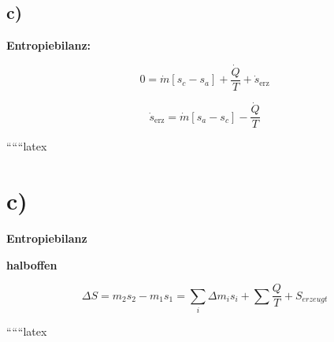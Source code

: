 

\subsection*{c)}

\textbf{Entropiebilanz:}

\[
0 = \dot{m} \left[ s_c - s_a \right] + \frac{\dot{Q}}{T} + \dot{s}_{\text{erz}}
\]

\[
\dot{s}_{\text{erz}} = \dot{m} \left[ s_a - s_c \right] - \frac{\dot{Q}}{T}
\]

``````latex



\section*{c)}

\textbf{Entropiebilanz}

\textbf{halboffen}

\[
\Delta S = m_2 s_2 - m_1 s_1 = \sum_i \Delta m_i s_i + \sum \frac{Q}{T} + S_{erzeugt}
\]

``````latex